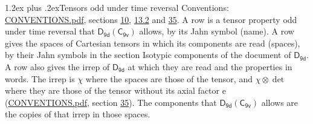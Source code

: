 \documentclass[10pt,a4paper]{article}
\makeatletter
\renewcommand\section{\@startsection{section}{1}{\z@}{-3ex plus -1ex minus -.2ex}%
  {1.2ex plus .2ex}{\normalfont\large\sffamily\bfseries\color{parttitle}}}
\numberwithin{equation}{section}
\newcommand{\grp}[1]{\mathsf{#1}}
\newcommand{\irrprod}{\otimes}
\makeatother
\begin{document}
\section{Tensors odd under time reversal}\label{s:time_odd}
Conventions: \href{../../CONVENTIONS.pdf}{CONVENTIONS.pdf}, sections \href{../../../rotation/CONVENTIONS.pdf\#conv.10}{10}, \href{../../../rotation/CONVENTIONS.pdf\#conv.13.2}{13.2} and \href{../../CONVENTIONS.pdf\#conv.35}{35}.
\leavevmode\label{n:head.name.property}A row is a tensor property odd under time reversal that $\grp{D_{9d}}(\grp{C_{9v}})$ allows, by its Jahn symbol (name). \label{n:head.spaces}A row gives the spaces of Cartesian tensors in which its components are read (spaces), by their Jahn symbols in the section Isotypic components of the document of \href{../../../rotation/data/pdf/D9d.pdf}{$\grp{D_{9d}}$}. \label{n:head.properties}A row also gives the irrep of $\grp{D_{9d}}$ at which they are read and the properties in words. The irrep is $\chi$ where the spaces are those of the tensor, and $\chi \irrprod \det$ where they are those of the tensor without its axial factor e (\href{../../CONVENTIONS.pdf}{CONVENTIONS.pdf}, section \href{../../CONVENTIONS.pdf\#conv.35}{35}). The components that $\grp{D_{9d}}(\grp{C_{9v}})$ allows are the copies of that irrep in those spaces.
\end{document}
